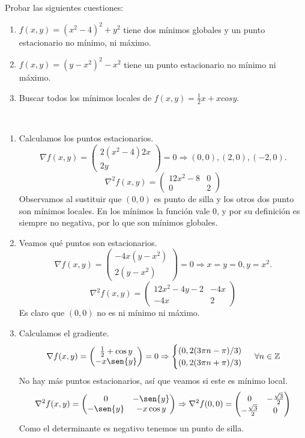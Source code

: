 \documentclass[twoside]{article}
\begin{document}
\begin{ejercicio}{8}
Probar las siguientes cuestiones:
\begin{enumerate}
\item $f(x,y)=(x^2-4)^2+y^2$ tiene dos mínimos globales y un punto estacionario no mínimo, ni máximo.
\item $f(x,y)=(y-x^2)^2-x^2$ tiene un punto estacionario no mínimo ni máximo.
\item Buscar todos los mínimos locales de $f(x,y)=\frac{1}{2}x+xcosy$.
\end{enumerate}

\begin{solucion}\
\begin{enumerate}
\item Calculamos los puntos estacionarios.
$$\nabla f(x,y)=\begin{pmatrix}
2(x^2-4)2x\\
2y
\end{pmatrix}=0\Rightarrow (0,0),(2,0),(-2,0).$$
$$\nabla^2 f(x,y)=\begin{pmatrix}
12x^2-8 & 0\\	
0 & 2
\end{pmatrix}$$
Observamos al sustituir que $(0,0)$ es punto de silla y los otros dos punto son mínimos locales. En los mínimos la función vale 0, y por su definición es siempre no negativa, por lo que son mínimos globales.
\item Veamos qué puntos son estacionarios.
$$\nabla f(x,y)=\begin{pmatrix}
-4x(y-x^2)\\
2(y-x^2)
\end{pmatrix}=0\Rightarrow x=y=0, y=x^2.$$
$$\nabla^2 f(x,y)=\begin{pmatrix}
12x^2-4y-2 & -4x\\
-4x & 2
\end{pmatrix}$$
Es claro que $(0,0)$ no es ni mínimo ni máximo. 
\item Calculamos el gradiente. $$\nabla f(x,y)=\begin{pmatrix}
\frac{1}{2}+\cos{y}\\
-x\sen{y}
\end{pmatrix}=0\Rightarrow \begin{cases}
(0,2(3\pi n -\pi)/3)\\
(0,2(3\pi n +\pi)/3)
\end{cases}\; \forall n\in\Z$$
No hay más puntos estacionarios, así que veamos si este es mínimo local.
$$\nabla^2 f(x,y)=\begin{pmatrix}
0 & -\sen{y}\\
-\sen{y} & -x\cos{y}
\end{pmatrix}\Rightarrow \nabla^2f(0,0)=\begin{pmatrix}
0 & -\frac{\sqrt{3}}{2}\\
-\frac{\sqrt{3}}{2}& 0
\end{pmatrix}$$
Como el determinante es negativo tenemos un punto de silla.
\end{enumerate}
\end{solucion}
\end{ejercicio}
\end{document}
